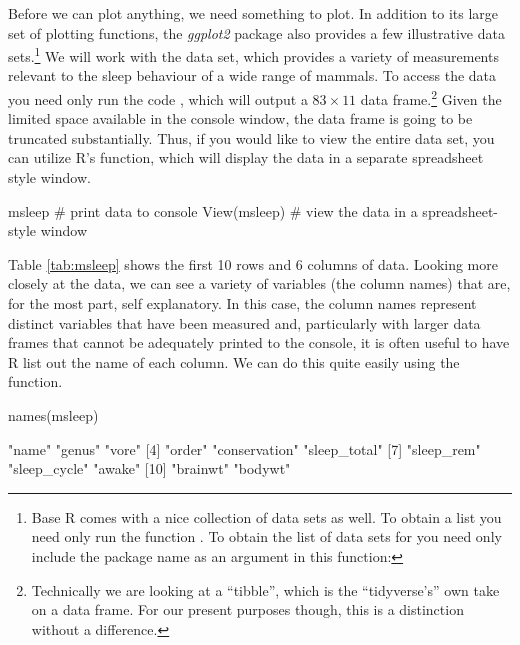 Before we can plot anything, we need something to plot.  In addition to its large set of plotting functions, the \textit{ggplot2} package also provides a few illustrative data sets.\footnote{Base R comes with a nice collection of data sets as well. To obtain a list you need only run the function .  To obtain the list of data sets for  you need only include the package name as an argument in this function: } We will work with the  data set, which provides a variety of measurements relevant to the sleep behaviour of a wide range of mammals. To access the data you need only run the code , which will output a $83 \times 11$ data frame.\footnote{Technically we are looking at a ``tibble'', which is the ``tidyverse's'' own take on a data frame. For our present purposes though, this is a distinction without a difference.} Given the limited space available in the console window, the data frame is going to be truncated substantially. Thus, if you would like to view the entire data set, you can utilize R's  function, which will display the data in a separate spreadsheet style window.

\begin{inR}
msleep # print data to console
View(msleep) # view the data in a spreadsheet-style window
\end{inR}

\vspace{2em}



\noindent
Table \ref{tab:msleep} shows the first 10 rows and 6 columns of  data.  Looking more closely at the data, we can see a variety of variables (the column names) that are, for the most part, self explanatory.
In this case, the column names represent distinct variables that have been measured and, particularly with larger data frames that cannot be adequately printed to the console, it is often useful to have R list out the name of each column. We can do this quite easily using the  function.

\begin{inR}
names(msleep)
\end{inR}
\begin{outR}
 [1] "name"         "genus"        "vore"        
 [4] "order"        "conservation" "sleep_total" 
 [7] "sleep_rem"    "sleep_cycle"  "awake"       
[10] "brainwt"      "bodywt"   
\end{outR}

